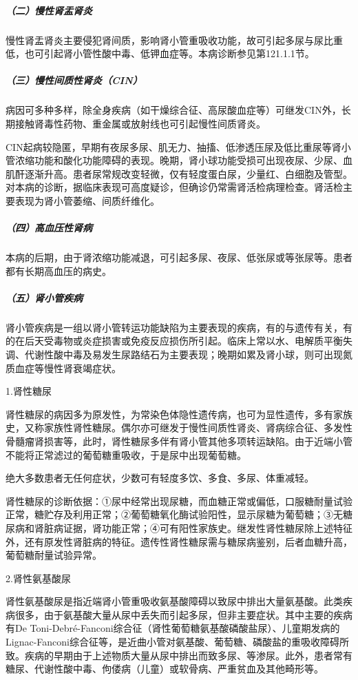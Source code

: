 \subparagraph{（二）慢性肾盂肾炎}

慢性肾盂肾炎主要侵犯肾间质，影响肾小管重吸收功能，故可引起多尿与尿比重低，也可引起肾小管性酸中毒、低钾血症等。本病诊断参见第121.1.1节。

\subparagraph{（三）慢性间质性肾炎（CIN）}

病因可多种多样，除全身疾病（如干燥综合征、高尿酸血症等）可继发CIN外，长期接触肾毒性药物、重金属或放射线也可引起慢性间质肾炎。

CIN起病较隐匿，早期有夜尿多尿、肌无力、抽搐、低渗透压尿及低比重尿等肾小管浓缩功能和酸化功能障碍的表现。晚期，肾小球功能受损可出现夜尿、少尿、血肌酐逐渐升高。患者尿常规改变轻微，仅有轻度蛋白尿，少量红、白细胞及管型。对本病的诊断，据临床表现可高度疑诊，但确诊仍常需肾活检病理检查。肾活检主要表现为肾小管萎缩、间质纤维化。

\subparagraph{（四）高血压性肾病}

本病的后期，由于肾浓缩功能减退，可引起多尿、夜尿、低张尿或等张尿等。患者都有长期高血压的病史。

\subparagraph{（五）肾小管疾病}

肾小管疾病是一组以肾小管转运功能缺陷为主要表现的疾病，有的与遗传有关，有的在后天受毒物或炎症损害或免疫反应损伤所引起。临床上常以水、电解质平衡失调、代谢性酸中毒及易发生尿路结石为主要表现；晚期如累及肾小球，则可出现氮质血症等慢性肾衰竭症状。

\hypertarget{text00273.htmlux5cux23CHP35-2-2-2-2-5-1}{}
1.肾性糖尿

肾性糖尿的病因多为原发性，为常染色体隐性遗传病，也可为显性遗传，多有家族史，又称家族性肾性糖尿。偶尔亦可继发于慢性间质性肾炎、肾病综合征、多发性骨髓瘤肾损害等，此时，肾性糖尿多伴有肾小管其他多项转运缺陷。由于近端小管不能将正常滤过的葡萄糖重吸收，于是尿中出现葡萄糖。

绝大多数患者无任何症状，少数可有轻度多饮、多食、多尿、体重减轻。

肾性糖尿的诊断依据：①尿中经常出现尿糖，而血糖正常或偏低，口服糖耐量试验正常，糖贮存及利用正常；②葡萄糖氧化酶试验阳性，显示尿糖为葡萄糖；③无糖尿病和肾脏病证据，肾功能正常；④可有阳性家族史。继发性肾性糖尿除上述特征外，还有原发性肾脏病的特征。遗传性肾性糖尿需与糖尿病鉴别，后者血糖升高，葡萄糖耐量试验异常。

\hypertarget{text00273.htmlux5cux23CHP35-2-2-2-2-5-2}{}
2.肾性氨基酸尿

肾性氨基酸尿是指近端肾小管重吸收氨基酸障碍以致尿中排出大量氨基酸。此类疾病很多，由于氨基酸大量从尿中丢失而引起多尿，但非主要症状。其中主要的疾病有De
Toni-Debré-Fanconi综合征（肾性葡萄糖氨基酸磷酸盐尿）、儿童期发病的Lignac-Fanconi综合征等，是近曲小管对氨基酸、葡萄糖、磷酸盐的重吸收障碍所致。疾病的早期由于上述物质大量从尿中排出而致多尿、等渗尿。此外，患者常有糖尿、代谢性酸中毒、佝偻病（儿童）或软骨病、严重贫血及其他畸形等。

